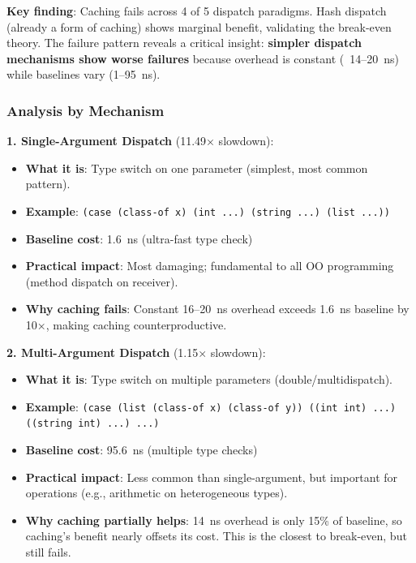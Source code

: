 \documentclass[sigplan,final]{acmart}
\begin{document}
\textbf{Key finding}: Caching fails across 4 of 5 dispatch paradigms. Hash dispatch (already a form
of caching) shows marginal benefit, validating the break-even theory. The failure pattern reveals a
critical insight: \textbf{simpler dispatch mechanisms show worse failures} because overhead is
constant (~14--20~ns) while baselines vary (1--95~ns).

\subsubsection{Analysis by Mechanism}

\textbf{1. Single-Argument Dispatch} (11.49× slowdown):
\begin{itemize}
  \item \textbf{What it is}: Type switch on one parameter (simplest, most common pattern).
  \item \textbf{Example}: \texttt{(case (class-of x) (int ...) (string ...) (list ...))}
  \item \textbf{Baseline cost}: 1.6~ns (ultra-fast type check)
  \item \textbf{Practical impact}: Most damaging; fundamental to all OO programming (method dispatch on receiver).
  \item \textbf{Why caching fails}: Constant 16--20~ns overhead exceeds 1.6~ns baseline by 10×, making caching counterproductive.
\end{itemize}

\textbf{2. Multi-Argument Dispatch} (1.15× slowdown):
\begin{itemize}
  \item \textbf{What it is}: Type switch on multiple parameters (double/multidispatch).
  \item \textbf{Example}: \texttt{(case (list (class-of x) (class-of y)) ((int int) ...) ((string int) ...) ...)}
  \item \textbf{Baseline cost}: 95.6~ns (multiple type checks)
  \item \textbf{Practical impact}: Less common than single-argument, but important for operations (e.g., arithmetic on heterogeneous types).
  \item \textbf{Why caching partially helps}: 14~ns overhead is only 15\% of baseline, so caching's benefit nearly offsets its cost. This is the closest to break-even, but still fails.
\end{itemize}
\end{document}
